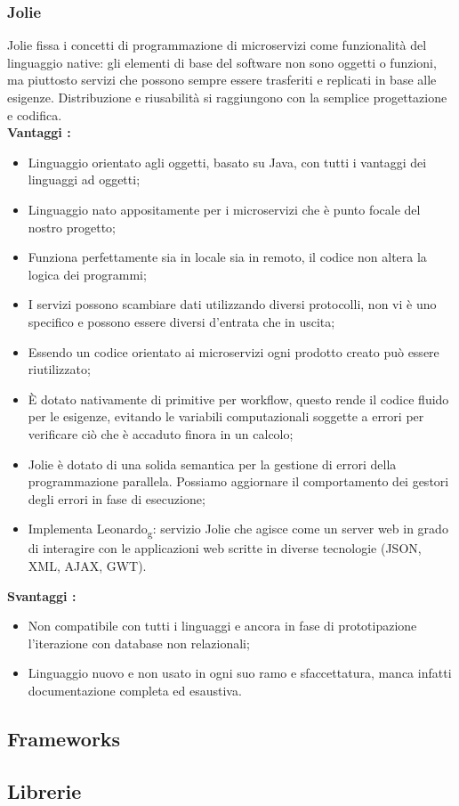 {{		\subsubsection{Jolie}{
			Jolie fissa i concetti di programmazione di microservizi come funzionalità del linguaggio native: gli elementi di base del software non sono oggetti o funzioni, ma piuttosto servizi che possono sempre essere trasferiti e replicati in base alle esigenze. Distribuzione e riusabilità si raggiungono con la semplice progettazione e codifica.\\
			\textbf{Vantaggi :}
			\begin{itemize}\itemsep1pt
				\item Linguaggio orientato agli oggetti, basato su Java, con tutti i vantaggi dei linguaggi ad oggetti;
				\item Linguaggio nato appositamente per i microservizi che è punto focale del nostro progetto;
				\item Funziona perfettamente sia in locale sia in remoto, il codice non altera la logica dei programmi;
				\item I servizi possono scambiare dati utilizzando diversi protocolli, non vi è uno specifico e possono essere diversi d'entrata che in uscita;
				\item Essendo un codice orientato ai microservizi ogni prodotto creato può essere riutilizzato;
				\item È dotato nativamente di primitive per workflow, questo rende il codice fluido per le esigenze, evitando le variabili computazionali soggette a errori per verificare ciò che è accaduto finora in un calcolo;
				\item Jolie è dotato di una solida semantica per la gestione di errori della programmazione parallela. Possiamo  aggiornare il comportamento dei gestori degli errori in fase di esecuzione;
				\item Implementa Leonardo\textsubscript{g}: servizio Jolie che agisce come un server web in grado di interagire con le applicazioni web scritte in diverse tecnologie (JSON, XML, AJAX, GWT). 
			\end{itemize}
			\textbf{Svantaggi :}
			\begin{itemize}\itemsep1pt
				\item Non compatibile con tutti i linguaggi e ancora in fase di prototipazione l'iterazione con database non relazionali;
				\item Linguaggio nuovo e non usato in ogni suo ramo e sfaccettatura, manca infatti documentazione completa ed esaustiva.
			\end{itemize}
		}
	}
	\subsection{Frameworks}{
	
	}
	\subsection{Librerie}{
	
	}
}
